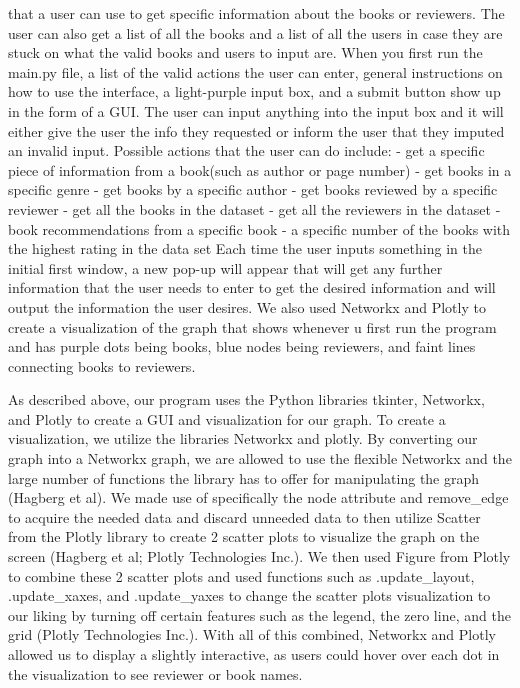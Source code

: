 \documentclass{article}
\begin{document}
that a user can use to get specific information about the books or reviewers. The user can also get a list of all the books and a list of all the users in case they are stuck on what the valid books and users to input are. 
When you first run the main.py file, a list of the valid actions the user can enter, general instructions on how to use the interface, a light-purple input box, and a submit button show up in the form of a GUI. The user can input anything into the input box and it will either give the user the info they requested or inform the user that they imputed an invalid input.
Possible actions that the user can do include:
- get a specific piece of information from a book(such as author or page number)
- get books in a specific genre
- get books by a specific author
- get books reviewed by a specific reviewer
- get all the books in the dataset
- get all the reviewers in the dataset
- book recommendations from a specific book
- a specific number of the books with the highest rating in the data set
Each time the user inputs something in the initial first window, a new pop-up will appear that will get any further information that the user needs to enter to get the desired information and will output the information the user desires.
We also used Networkx and Plotly to create a visualization of the graph that shows whenever u first run the program and has purple dots being books, blue nodes being reviewers, and faint lines connecting books to reviewers.


As described above, our program uses the Python libraries tkinter, Networkx, and Plotly to create a GUI and visualization for our graph. 
To create a visualization, we utilize the libraries Networkx and plotly. By converting our graph into a Networkx graph, we are allowed to use the flexible Networkx and the large number of functions the library has to offer for manipulating the graph (Hagberg et al). We made use of specifically the node attribute and remove\_edge to acquire the needed data and discard unneeded data to then utilize Scatter from the Plotly library to create 2 scatter plots to visualize the graph on the screen (Hagberg et al; Plotly Technologies Inc.). We then used Figure from Plotly to combine these 2 scatter plots and used functions such as .update\_layout, .update\_xaxes, and .update\_yaxes to change the scatter plots visualization to our liking by turning off certain features such as the legend, the zero line, and the grid (Plotly Technologies Inc.). With all of this combined, Networkx and Plotly allowed us to display a slightly interactive, as users could hover over each dot in the visualization to see reviewer or book names.
\end{document}
